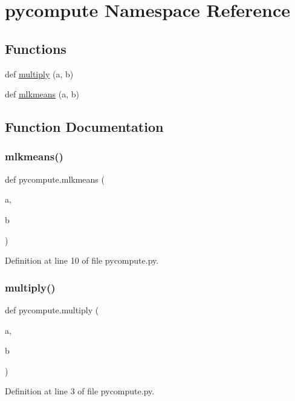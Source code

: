 \hypertarget{namespacepycompute}{}\section{pycompute Namespace Reference}
\label{namespacepycompute}
\subsection*{Functions}
\begin{DoxyCompactItemize}
\item 
def \hyperlink{namespacepycompute_af7498e1653825e1a7a7a7d4a1e2701ac}{multiply} (a, b)
\item 
def \hyperlink{namespacepycompute_a9e38483f46fe7cb78b9168755e4a410d}{mlkmeans} (a, b)
\end{DoxyCompactItemize}


\subsection{Function Documentation}
\mbox{\label{namespacepycompute_a9e38483f46fe7cb78b9168755e4a410d}} 
\subsubsection{\texorpdfstring{mlkmeans()}{mlkmeans()}}
{\footnotesize\ttfamily def pycompute.\+mlkmeans (\begin{DoxyParamCaption}\item[{}]{a,  }\item[{}]{b }\end{DoxyParamCaption})}



Definition at line 10 of file pycompute.\+py.

\mbox{\label{namespacepycompute_af7498e1653825e1a7a7a7d4a1e2701ac}} 
\subsubsection{\texorpdfstring{multiply()}{multiply()}}
{\footnotesize\ttfamily def pycompute.\+multiply (\begin{DoxyParamCaption}\item[{}]{a,  }\item[{}]{b }\end{DoxyParamCaption})}



Definition at line 3 of file pycompute.\+py.

